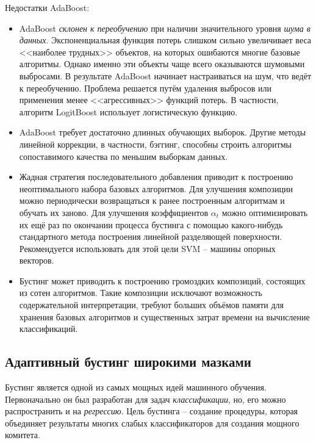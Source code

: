 \documentclass[%
	11pt,
	a4paper,
	utf8,
		]{article}
\begin{document}
Недостатки AdaBoost:
\begin{itemize}
	\item AdaBoost \emph{\color{red}склонен к переобучению} при наличии значительного уровня \emph{шума в данных}. Экспоненциальная функция потерь слишком сильно увеличивает веса <<наиболее трудных>> объектов, на которых ошибаются многие базовые алгоритмы. Однако именно эти объекты чаще всего оказываются шумовыми выбросами. В результате AdaBoost начинает настраиваться на шум, что ведёт к переобучению. Проблема решается путём удаления выбросов или применения менее <<агрессивных>> функций потерь. В частности, алгоритм LogitBoost использует логистическую функцию.
	
	\item AdaBoost требует достаточно длинных обучающих выборок. Другие методы
	линейной коррекции, в частности, бэггинг, способны строить алгоритмы сопоставимого качества по меньшим выборкам данных.
	
	\item Жадная стратегия последовательного добавления приводит к построению
	неоптимального набора базовых алгоритмов. Для улучшения композиции можно периодически возвращаться к ранее построенным алгоритмам и обучать их
	заново. Для улучшения коэффициентов $ \alpha_t $ можно оптимизировать их ещё раз по окончании процесса бустинга с помощью какого-нибудь стандартного метода построения линейной разделяющей поверхности. Рекомендуется использовать для этой цели SVM -- машины опорных векторов.
	
	\item Бустинг может приводить к построению громоздких композиций, состоящих
	из сотен алгоритмов. Такие композиции исключают возможность содержательной интерпретации, требуют больших объёмов памяти для хранения базовых
	алгоритмов и существенных затрат времени на вычисление классификаций.
\end{itemize}


\subsection{Адаптивный бустинг широкими мазками}

Бустинг является одной из самых мощных идей машинного обучения. Первоначально он был разработан для задач \emph{классификации}, но, его можно распространить и на \emph{регрессию}. Цель бустинга -- создание процедуры, которая объединяет результаты многих слабых классификаторов для создания мощного комитета.
\end{document}

